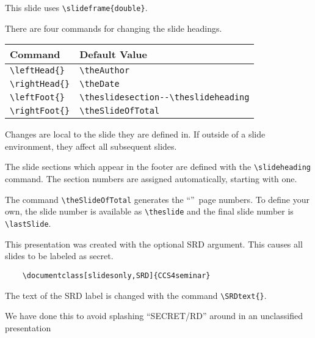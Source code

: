\documentclass[SRD,
               slidesonly,
                notes
              ]{CCS4seminar}
\begin{document}
\begin{slide}


  This slide uses \verb=\slideframe{double}=.


  \renewcommand{\slideheadfont}{\bfseries}
  \renewcommand{\slidefootfont}{\bfseries}


  There are four commands for changing the slide headings.

  \begin{center}
    \begin{tabular}{|l|l|} \hline
      Command & Default Value \\ \hline 
      \verb=\leftHead{}=  & \verb=\theAuthor= \\
      \verb=\rightHead{}= & \verb=\theDate=   \\
      \verb=\leftFoot{}=  & \verb=\theslidesection--\theslideheading= \\
      \verb=\rightFoot{}= & \verb=\theSlideOfTotal=  \\ \hline
    \end{tabular}
  \end{center}
  
  Changes are local to the slide they are defined in. If outside of a
  slide environment, they affect all subsequent slides.

\end{slide}

\begin{slide}

  The slide sections which appear in the footer are defined with the
  \verb=\slideheading= command. The section numbers are assigned
  automatically, starting with one.

  The command \verb=\theSlideOfTotal= generates the ``\theSlideOfTotal''\
  page numbers. To define your own, the slide number is available as
  \verb=\theslide= and the final slide number is \verb=\lastSlide=.

\end{slide}

\begin{slide}

  This presentation was created with the optional SRD argument. This
  causes all slides to be labeled as secret.

  \begin{verbatim}
    \documentclass[slidesonly,SRD]{CCS4seminar}
  \end{verbatim}
  The text of the SRD label is changed with the command
  \verb=\SRDtext{}=. 
  
  We have done this to avoid splashing ``SECRET/RD'' around in an
  unclassified presentation

\end{slide}
\end{document}

